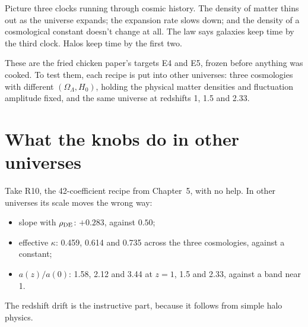 Picture three clocks running through cosmic history. The density of matter thins out as the universe expands; the expansion rate slows down; and the density of a cosmological constant doesn't change at all. The law says galaxies keep time by the third clock. Halos keep time by the first two.




These are the fried chicken paper's targets E4 and E5, frozen before anything was cooked. To test them, each recipe is put into other universes: three cosmologies with different $(\Omega_\Lambda,H_0)$, holding the physical matter densities and fluctuation amplitude fixed, and the same universe at redshifts 1, 1.5 and 2.33.

\section{What the knobs do in other universes}

Take R10, the 42-coefficient recipe from Chapter~5, with no help. In other universes its scale moves the wrong way:
\begin{itemize}
\item slope with $\rho_{\rm DE}$: $+0.283$, against $0.50$;
\item effective $\kappa$: 0.459, 0.614 and 0.735 across the three cosmologies, against a constant;
\item $a(z)/a(0)$: 1.58, 2.12 and 3.44 at $z=1$, 1.5 and 2.33, against a band near 1.
\end{itemize}




The redshift drift is the instructive part, because it follows from simple halo physics.

